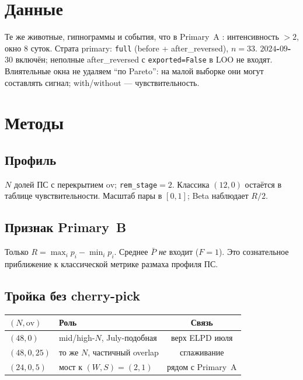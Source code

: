 \documentclass{article}
\begin{document}
\section{Данные}

Те же животные, гипнограммы и события, что в Primary~A
\cite{Saevskiy2025,Vyazovskiy2005}: интенсивность $>2$, окно
$8$ суток. Страта primary: \texttt{full} (before +
after\_reversed), $n{=}33$. \textbf{$2024$-$09$-$30$} включён;
неполные after\_reversed с \texttt{exported=False} в LOO не
входят. Влиятельные окна не удаляем ``по Pareto'': на малой
выборке они могут составлять сигнал; with/without --- чувствительность.

\section{Методы}

\subsection{Профиль}

$N$ долей ПС с перекрытием $\mathrm{ov}$; \texttt{rem\_stage}${}=2$.
Классика $(12,0)$ остаётся в таблице чувствительности. Масштаб
пары в $[0,1]$; Beta наблюдает $R/2$.

\subsection{Признак Primary~B}

Только $R=\max_i p_i-\min_i p_i$. Среднее $\bar P$ \emph{не}
входит ($F{=}1$). Это сознательное приближение к классической
метрике размаха профиля ПС.

\subsection{Тройка без cherry-pick}

\begin{center}
\small
\begin{tabular}{llc}
\toprule
$(N,\mathrm{ov})$ & Роль & Связь\\
\midrule
$(48,0)$ & mid/high-$N$, July-подобная & верх ELPD июля\\
$(48,0{,}25)$ & то же $N$, частичный overlap & сглаживание\\
$(24,0{,}5)$ & мост к $(W,S){=}(2,1)$ & рядом с Primary~A\\
\bottomrule
\end{tabular}
\end{center}
\end{document}
